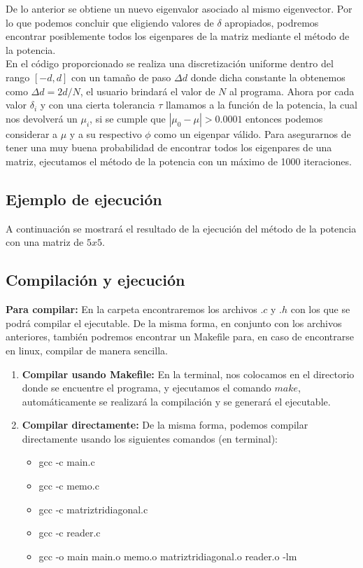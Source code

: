 \documentclass[12pt]{article}
\begin{document}
De lo anterior se obtiene un nuevo eigenvalor asociado al mismo eigenvector. Por lo que podemos concluir que eligiendo valores de $\delta$ apropiados, podremos encontrar posiblemente todos los eigenpares de la matriz mediante el método de la potencia.\\
En el código proporcionado se realiza una discretización uniforme dentro del rango $[-d, d]$ con un tamaño de paso $\Delta d$ donde dicha constante la obtenemos como $\Delta d = 2d / N$, el usuario brindará el valor de $N$ al programa. Ahora por cada valor $\delta_i$ y con una cierta tolerancia $\tau$ llamamos a la función de la potencia, la cual nos devolverá un $\mu_i$, si se cumple que $|\mu_0 - \mu| > 0.0001$ entonces podemos considerar a $\mu$ y a su respectivo $\phi$ como un eigenpar válido. Para asegurarnos de tener una muy buena probabilidad de encontrar todos los eigenpares de una matriz, ejecutamos el método de la potencia con un máximo de 1000 iteraciones.

\subsection{Ejemplo de ejecución}
A continuación se mostrará el resultado de la ejecución del método de la potencia con una matriz de $5x5$.



\subsection{Compilación y ejecución}
\textbf{Para compilar:} En la carpeta encontraremos los archivos $.c$ y $.h$ con los que se podrá compilar el ejecutable. De la misma forma, en conjunto con los archivos anteriores, también podremos encontrar un Makefile para, en caso de encontrarse en linux, compilar de manera sencilla.

\begin{enumerate}
	\item \textbf{Compilar usando Makefile:} En la terminal, nos colocamos en el directorio donde se encuentre el programa, y ejecutamos el comando $make$, automáticamente se realizará la compilación y se generará el ejecutable.\\
	\item \textbf{Compilar directamente:} De la misma forma, podemos compilar directamente usando los siguientes comandos (en terminal):\\
	\begin{itemize}
		\item gcc -c main.c
		\item gcc -c memo.c
		\item gcc -c matriztridiagonal.c
		\item gcc -c reader.c
		\item gcc -o main main.o memo.o matriztridiagonal.o reader.o -lm
	\end{itemize}
\end{enumerate}
\end{document}
